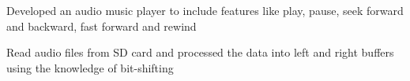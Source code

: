 \documentclass[letterpaper, 10pt]{deedy-resume} %
\begin{document}
\begin{minipage}[t]{0.65\textwidth}
\begin{tightitemize}
\item Developed an audio music player to include features like play, pause, seek forward and backward, fast forward and rewind
\item Read audio files from SD card and processed the data into left and right buffers using the knowledge of bit-shifting
\end{tightitemize}
\sectionspace









\end{minipage}
\end{document}
